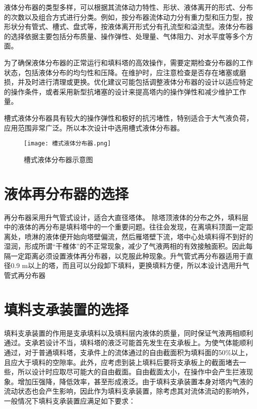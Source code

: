 液体分布器的类型多样，可以根据其流体动力特性、形状、液体离开的形式、分布的次数以及组合方式进行分类。例如，按分布器流体动力分有重力型和压力型，按形状分有管式、槽式、盘式等，按液体离开形式分有孔流型和溢流型。液体分布器的选择依据主要包括分布质量、操作弹性、处理量、气体阻力、对水平度等多个方面。

为了确保液体分布器的正常运行和填料塔的高效操作，需要定期检查分布器的工作状态，包括液体分布的均匀性和压降。在维护时，应注意检查是否存在堵塞或磨损，并及时进行清理或更换。优化建议可能包括调整液体分布器的设计以适应特定的操作条件，或者采用新型抗堵塞的设计来提高塔内的操作弹性和减少维护工作量。

槽式液体分布器具有较大的操作弹性和极好的抗污堵性，特别适合于大气液负荷，应用范围非常广泛。所以本次设计中选用槽式液体分布器。

\begin{figure}[H]
	\centering
	\texttt{[image: 槽式液体分布器.png]}
	\caption{槽式液体分布器示意图}
\end{figure}



\section{液体再分布器的选择}
再分布器采用升气管式设计，适合大直径塔体。
除塔顶液体的分布之外，填料层中的液体的再分布是填料塔中的一个重要问题。往往会发现，在离填料顶面一定距离处，喷淋的液体便开始向塔壁偏流，然后雁塔壁下流，塔中心处填料得不到好的湿润，形成所谓“干椎体”的不正常现象，减少了气液两相的有效接触面积。因此每隔一定距离必须设置液体再分布器，以克服此种现象。升气管式再分布器适用于直径0.9 m以上的塔，而且可以分段卸下填料，更换填料方便，所以本设计选用升气管式再分布器



\section{填料支承装置的选择}
填料支承装置的作用是支承填料以及填料层内液体的质量，同时保证气液两相顺利通过。支承若设计不当，填料塔的液泛可能首先发生在支承板上。为使气体能顺利通过，对于普通填料塔，支承件上的流体通过的自由截面积为填料面的50\%以上，且应大于填料的空隙率。此外，应考虑到装上填料后要将支承板上的截面堵去一些，所以设计时应取尽可能大的自由截面。自由截面太小，在操作中会产生拦液现象。增加压强降，降低效率，甚至形成液泛。由于填料支承装置本身对塔内气液的流动状态也会产生影响，因此作为填料支承装置，除考虑其对流体流动的影响外，一般情况下填料支承装置应满足如下要求：

